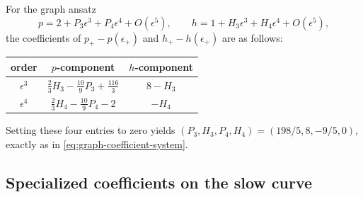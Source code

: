 \documentclass[smallextended,envcountsame]{svjour3}
\begin{document}
For the graph ansatz
\[
p=2+P_3\epsilon^3+P_4\epsilon^4+O(\epsilon^5),\qquad
h=1+H_3\epsilon^3+H_4\epsilon^4+O(\epsilon^5),
\]
the coefficients of $p_+-p(\epsilon_+)$ and
$h_+-h(\epsilon_+)$ are as follows:
\begin{center}
\begin{tabular}{c@{\qquad}c@{\qquad}c}
\toprule
order & $p$-component & $h$-component\\
\midrule
$\epsilon^3$ & $\frac23H_3-\frac{10}{9}P_3+\frac{116}{3}$
              & $8-H_3$\\[2pt]
$\epsilon^4$ & $\frac23H_4-\frac{10}{9}P_4-2$
              & $-H_4$\\
\bottomrule
\end{tabular}
\end{center}
Setting these four entries to zero yields
$(P_3,H_3,P_4,H_4)=(198/5,8,-9/5,0)$, exactly as in
\eqref{eq:graph-coefficient-system}.

\subsection{Specialized coefficients on the slow curve}
\end{document}
